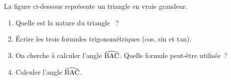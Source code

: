 \documentclass[activite]{thedocument}
\begin{document}
La figure ci-dessous représente un triangle en vraie grandeur.\par\medskip\noindent
    {\centering
    \medskip\par}
    \begin{enumerate}
        \item Quelle est la nature du triangle ~?
        \answerspace{2em}
        \item Écrire les trois formules trigonométriques (cos, sin et tan).
        \answerspace{3em}
        \item On cherche à calculer l'angle $\widehat{\text{BAC}}$.
        Quelle formule peut-être utilisée~?
        \answerspace{3em}
        \item Calculer l'angle $\widehat{\text{BAC}}$.
        \answerspace{8em}
    \end{enumerate}
\end{document}
